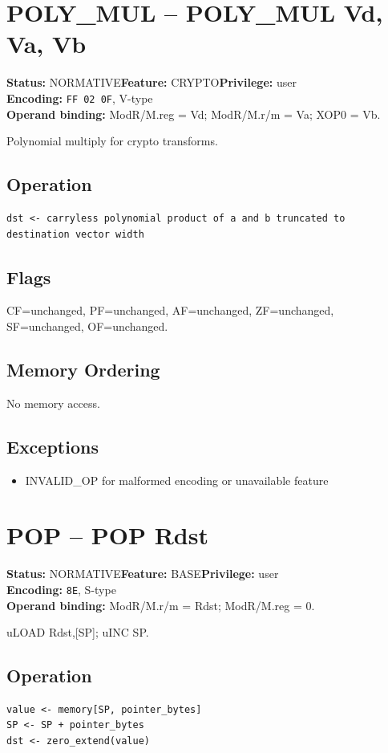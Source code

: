 \documentclass[10pt]{article}
\begin{document}
\section{POLY\_MUL -- POLY\_MUL Vd, Va, Vb}
\textbf{Status:} NORMATIVE\quad \textbf{Feature:} CRYPTO\quad \textbf{Privilege:} user\\
\textbf{Encoding:} \texttt{FF 02 0F}, V-type\\
\textbf{Operand binding:} ModR/M.reg = Vd; ModR/M.r/m = Va; XOP0 = Vb.

Polynomial multiply for crypto transforms.

\subsection*{Operation}
\begin{lstlisting}
dst <- carryless polynomial product of a and b truncated to destination vector width
\end{lstlisting}
\subsection*{Flags}
CF=unchanged, PF=unchanged, AF=unchanged, ZF=unchanged, SF=unchanged, OF=unchanged.
\subsection*{Memory Ordering}
No memory access.
\subsection*{Exceptions}
\begin{itemize}
\item INVALID\_OP for malformed encoding or unavailable feature
\end{itemize}
\clearpage

\section{POP -- POP Rdst}
\textbf{Status:} NORMATIVE\quad \textbf{Feature:} BASE\quad \textbf{Privilege:} user\\
\textbf{Encoding:} \texttt{8E}, S-type\\
\textbf{Operand binding:} ModR/M.r/m = Rdst; ModR/M.reg = 0.

uLOAD Rdst,[SP]; uINC SP.

\subsection*{Operation}
\begin{lstlisting}
value <- memory[SP, pointer_bytes]
SP <- SP + pointer_bytes
dst <- zero_extend(value)
\end{lstlisting}
\end{document}
